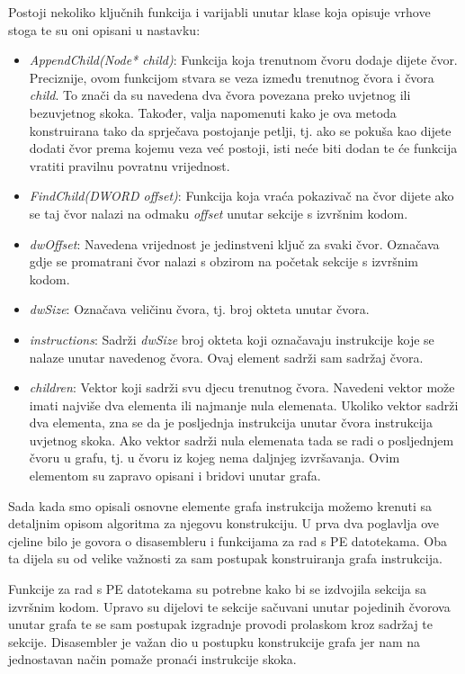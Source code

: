 \documentclass[times, utf8, diplomski, numeric]{fer}
\begin{document}
Postoji nekoliko ključnih funkcija i varijabli unutar klase koja opisuje vrhove
stoga te su oni opisani u nastavku:

\begin{itemize}
\item \emph{AppendChild(Node* child)}: Funkcija koja trenutnom čvoru dodaje
dijete čvor. Preciznije, ovom funkcijom stvara se veza između trenutnog čvora i
čvora \emph{child}. To znači da su navedena dva čvora povezana preko uvjetnog
ili bezuvjetnog skoka. Također, valja napomenuti kako je ova metoda
konstruirana tako da sprječava postojanje petlji, tj. ako se pokuša kao
dijete dodati čvor prema kojemu veza već postoji, isti neće biti dodan te će
funkcija vratiti pravilnu povratnu vrijednost.
\item \emph{FindChild(DWORD offset)}: Funkcija koja vraća pokazivač na čvor			%
dijete ako se taj čvor nalazi na odmaku \emph{offset} unutar sekcije s izvršnim kodom.
\item \emph{dwOffset}: Navedena vrijednost je jedinstveni ključ za svaki
čvor. Označava gdje se promatrani čvor nalazi s obzirom na početak sekcije
s izvršnim kodom.
\item \emph{dwSize}: Označava veličinu čvora, tj. broj okteta unutar čvora.
\item \emph{instructions}: Sadrži \emph{dwSize} broj okteta koji označavaju instrukcije koje se nalaze unutar navedenog čvora. Ovaj element sadrži sam sadržaj čvora.
\item \emph{children}: Vektor koji sadrži svu djecu trenutnog čvora. Navedeni
vektor može imati najviše dva elementa ili najmanje nula elemenata. Ukoliko
vektor sadrži dva elementa, zna se da je posljednja instrukcija unutar čvora
instrukcija uvjetnog skoka. Ako vektor sadrži nula elemenata tada se radi o
posljednjem čvoru u grafu, tj. u čvoru iz kojeg nema daljnjeg izvršavanja. Ovim
elementom su zapravo opisani i bridovi unutar grafa.
\end{itemize}

Sada kada smo opisali osnovne elemente grafa instrukcija možemo krenuti sa
detaljnim opisom algoritma za njegovu konstrukciju. U prva dva poglavlja ove
cjeline bilo je govora o disasembleru i funkcijama za rad s PE datotekama. Oba
ta dijela su od velike važnosti za sam postupak konstruiranja grafa
instrukcija.

Funkcije za rad s PE datotekama su potrebne kako bi se izdvojila sekcija sa
izvršnim kodom. Upravo su dijelovi te sekcije sačuvani unutar pojedinih čvorova
unutar grafa te se sam postupak izgradnje provodi prolaskom kroz sadržaj te
sekcije. Disasembler je važan dio u postupku konstrukcije grafa jer nam na
jednostavan način pomaže pronaći instrukcije skoka.
\end{document}
